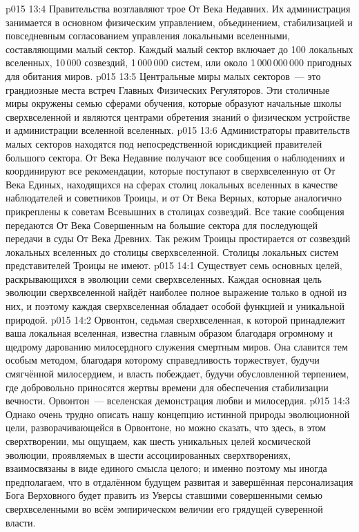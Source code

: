 \vs p015 13:4 \pc Правительства  возглавляют трое От Века Недавних. Их администрация занимается в основном физическим управлением, объединением, стабилизацией и повседневным согласованием управления локальными вселенными, составляющими малый сектор. Каждый малый сектор включает до 100 локальных вселенных, 10\,000 созвездий, 1\,000\,000 систем, или около 1\,000\,000\,000 пригодных для обитания миров.
\vs p015 13:5 Центральные миры малых секторов~--- это грандиозные места встреч Главных Физических Регуляторов. Эти столичные миры окружены семью сферами обучения, которые образуют начальные школы сверхвселенной и являются центрами обретения знаний о физическом устройстве и администрации вселенной вселенных.
\vs p015 13:6 Администраторы правительств малых секторов находятся под непосредственной юрисдикцией правителей большого сектора. От Века Недавние получают все сообщения о наблюдениях и координируют все рекомендации, которые поступают в сверхвселенную от От Века Единых, находящихся на сферах столиц локальных вселенных в качестве наблюдателей и советников Троицы, и от От Века Верных, которые аналогично прикреплены к советам Всевышних в столицах созвездий. Все такие сообщения передаются От Века Совершенным на большие сектора для последующей передачи в суды От Века Древних. Так режим Троицы простирается от созвездий локальных вселенных до столицы сверхвселенной. Столицы локальных систем представителей Троицы не имеют.
\vs p015 14:1 Существует семь основных целей, раскрывающихся в эволюции семи сверхвселенных. Каждая основная цель эволюции сверхвселенной найдёт наиболее полное выражение только в одной из них, и поэтому каждая сверхвселенная обладает особой функцией и уникальной природой.
\vs p015 14:2 Орвонтон, седьмая сверхвселенная, к которой принадлежит ваша локальная вселенная, известна главным образом благодаря огромному и щедрому дарованию милосердного служения смертным миров. Она славится тем особым методом, благодаря которому справедливость торжествует, будучи смягчённой милосердием, и власть побеждает, будучи обусловленной терпением, где добровольно приносятся жертвы времени для обеспечения стабилизации вечности. Орвонтон~--- вселенская демонстрация любви и милосердия.
\vs p015 14:3 Однако очень трудно описать нашу концепцию истинной природы эволюционной цели, разворачивающейся в Орвонтоне, но можно сказать, что здесь, в этом сверхтворении, мы ощущаем, как шесть уникальных целей космической эволюции, проявляемых в шести ассоциированных сверхтворениях, взаимосвязаны в виде единого смысла целого; и именно поэтому мы иногда предполагаем, что в отдалённом будущем развитая и завершённая персонализация Бога Верховного будет править из Уверсы ставшими совершенными семью сверхвселенными во всём эмпирическом величии его грядущей суверенной власти.
